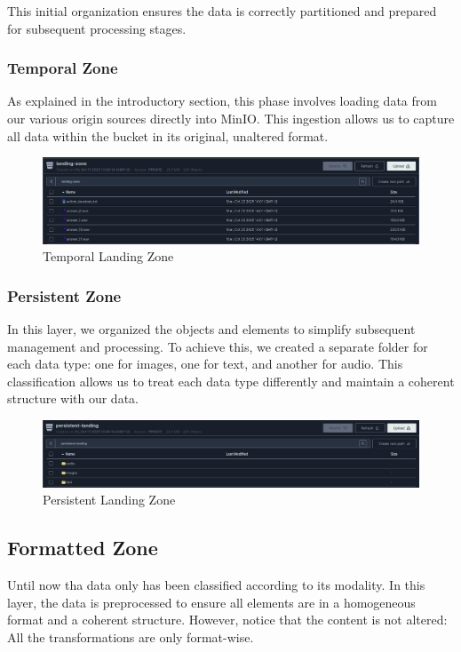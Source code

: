 \documentclass[12pt]{article}
\begin{document}
This initial organization ensures the data is correctly partitioned and prepared for subsequent processing stages.

\subsubsection{Temporal Zone}

As explained in the introductory section, this phase involves loading data from our various origin sources directly into MinIO. This ingestion allows us to capture all data within the bucket in its original, unaltered format.

\begin{figure}[H]
    \centering
    \includegraphics[width=1\linewidth]{temporal.png}
    \caption{Temporal Landing Zone}
    \label{fig:temporal}
\end{figure}

\subsubsection{Persistent Zone}

In this layer, we organized the objects and elements to simplify subsequent management and processing. To achieve this, we created a separate folder for each data type: one for images, one for text, and another for audio. This classification allows us to treat each data type differently and maintain a coherent structure with our data.


\begin{figure}[H]
    \centering
    \includegraphics[width=1\linewidth]{persistent.png}
    \caption{Persistent Landing Zone}
    \label{fig:persistent}
\end{figure}

\subsection{Formatted Zone}
Until now tha data only has been classified according to its modality. In this layer, the data is preprocessed to ensure all elements are in a homogeneous format and a coherent structure. However, notice that the content is not altered: All the transformations are only format-wise.
\end{document}
